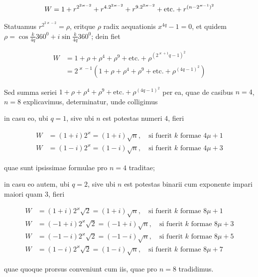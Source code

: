 \[
\begin{aligned}
W=1+r^{2^{2\varkappa-2}}+r^{4\mathbin{.}2^{2\varkappa-2}}+r^{9\mathbin{.}2^{2\varkappa-2}}+\text{etc.}+r^{(n-2^{\varkappa-1})^2}
\end{aligned}
\]

%
Statuamus $r^{2^{2\varkappa-2}}=\rho$, eritque $\rho$ radix aequationis $x^{4q}-1=0$, et quidem $\rho=\cos\frac{k}{4q}360^0+i\sin\frac{k}{4q}360^0$; dein fiet

\[
\begin{aligned}
W&=1+\rho+\rho^4+\rho^9+\text{etc.}+\rho^{(2^{\varkappa+1}q-1)^2}\\
&=2^{\varkappa-1}(1+\rho+\rho^4+\rho^9+\text{etc.}+\rho^{(4q-1)^2})
\end{aligned}
\]

Sed summa seriei $1+\rho+\rho^4+\rho^9+\text{etc.}+\rho^{(4q-1)^2}$ per ea, quae de casibus $n=4$, $n=8$ explicavimus, determinatur, unde colligimus

in casu eo, ubi $q=1$, sive ubi $n$ est potestas numeri $4$, fieri

\[
\begin{aligned}
W&=(1+i)2^\varkappa=(1+i)\surd n,\quad\text{si fuerit }k\text{ formae }4\mu+1\\
W&=(1-i)2^\varkappa=(1-i)\surd n,\quad\text{si fuerit }k\text{ formae }4\mu+3
\end{aligned}
\]

quae sunt ipsissimae formulae pro $n=4$ traditae;

in casu eo autem, ubi $q=2$, sive ubi $n$ est potestas binarii cum exponente impari maiori quam $3$, fieri

\[
\begin{aligned}
W&=(1+i)2^\varkappa\surd2=(1+i)\surd n,\quad\text{si fuerit }k\text{ formae }8\mu+1\\
W&=(-1+i)2^\varkappa\surd2=(-1+i)\surd n,\quad\text{si fuerit }k\text{ formae }8\mu+3\\
W&=(-1-i)2^\varkappa\surd2=(-1-i)\surd n,\quad\text{si fuerit }k\text{ formae }8\mu+5\\
W&=(1-i)2^\varkappa\surd2=(1-i)\surd n,\quad\text{si fuerit }k\text{ formae }8\mu+7
\end{aligned}
\]

quae quoque prorsus conveniunt cum iis, quae pro $n=8$ tradidimus.

